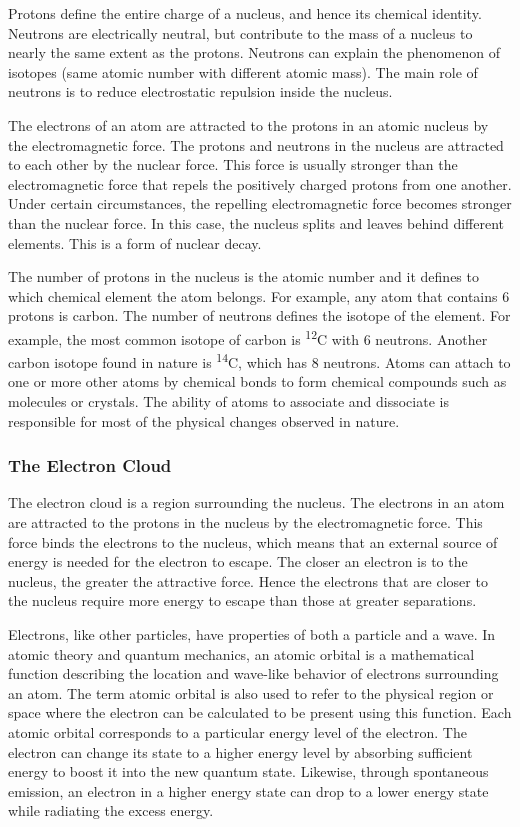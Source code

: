 \documentclass[
]{article}
\begin{document}
Protons define the entire charge of a nucleus, and hence its chemical
identity. Neutrons are electrically neutral, but contribute to the mass
of a nucleus to nearly the same extent as the protons. Neutrons can
explain the phenomenon of isotopes (same atomic number with different
atomic mass). The main role of neutrons is to reduce electrostatic
repulsion inside the nucleus.

The electrons of an atom are attracted to the protons in an atomic
nucleus by the electromagnetic force. The protons and neutrons in the
nucleus are attracted to each other by the nuclear force. This force is
usually stronger than the electromagnetic force that repels the
positively charged protons from one another. Under certain
circumstances, the repelling electromagnetic force becomes stronger than
the nuclear force. In this case, the nucleus splits and leaves behind
different elements. This is a form of nuclear decay.

The number of protons in the nucleus is the atomic number and it defines
to which chemical element the atom belongs. For example, any atom that
contains 6 protons is carbon. The number of neutrons defines the isotope
of the element. For example, the most common isotope of carbon is
\textsuperscript{12}C with 6 neutrons. Another carbon isotope found in
nature is \textsuperscript{14}C, which has 8 neutrons. Atoms can attach
to one or more other atoms by chemical bonds to form chemical compounds
such as molecules or crystals. The ability of atoms to associate and
dissociate is responsible for most of the physical changes observed in
nature.

\hypertarget{the-electron-cloud}{%
\subsubsection{The Electron Cloud}\label{the-electron-cloud}}

The electron cloud is a region surrounding the nucleus. The electrons in
an atom are attracted to the protons in the nucleus by the
electromagnetic force. This force binds the electrons to the nucleus,
which means that an external source of energy is needed for the electron
to escape. The closer an electron is to the nucleus, the greater the
attractive force. Hence the electrons that are closer to the nucleus
require more energy to escape than those at greater separations.

Electrons, like other particles, have properties of both a particle and
a wave. In atomic theory and quantum mechanics, an atomic orbital is a
mathematical function describing the location and wave-like behavior of
electrons surrounding an atom. The term atomic orbital is also used to
refer to the physical region or space where the electron can be
calculated to be present using this function. Each atomic orbital
corresponds to a particular energy level of the electron. The electron
can change its state to a higher energy level by absorbing sufficient
energy to boost it into the new quantum state. Likewise, through
spontaneous emission, an electron in a higher energy state can drop to a
lower energy state while radiating the excess energy.
\end{document}
